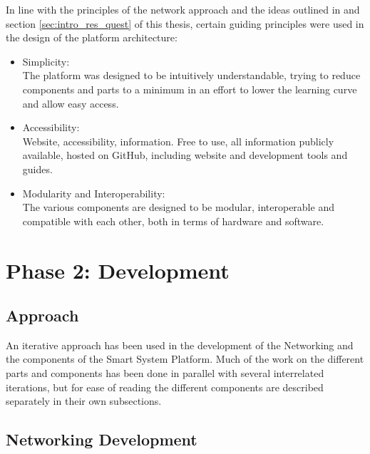 
In line with the principles of the network approach and the ideas outlined in \citet[]{dahal_designing_2024} and section \ref{sec:intro_res_quest} of this thesis, certain guiding principles were used in the design of the platform architecture: 

\begin{itemize}
    \item Simplicity:\\
    The platform was designed to be intuitively understandable, trying to reduce components and parts to a minimum in an effort to lower the learning curve and allow easy access.
    \item Accessibility:\\
    Website, accessibility, information. Free to use, all information publicly available, hosted on GitHub, including website and development tools and guides.
    \item Modularity and Interoperability:\\
    The various components are designed to be modular, interoperable and compatible with each other, both in terms of hardware and software. 
\end{itemize}

\section{\label{sec:methods_ph2}Phase 2: Development}

\subsection{\label{sec:methods_approach}Approach}

An iterative approach has been used in the development of the Networking and the components of the Smart System Platform. Much of the work on the different parts and components has been done in parallel with several interrelated iterations, but for ease of reading the different components are described separately in their own subsections.

\subsection{\label{sec:methods_net_dev}Networking Development}

